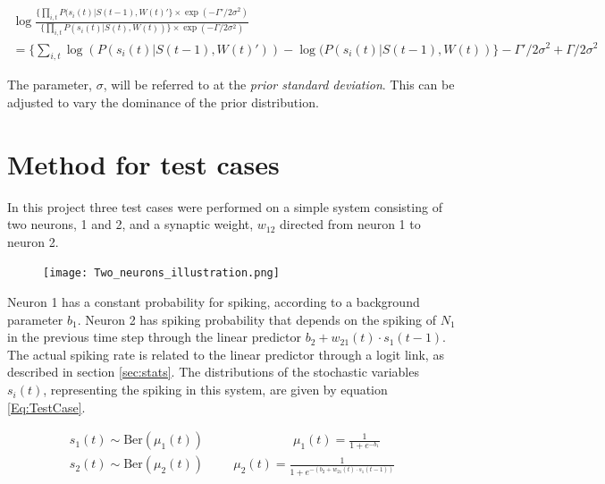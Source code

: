 \begin{equation}
\label{eq:ratio}
\begin{split}
    \log \frac{\big \{ \prod_{i,t} P(s_{i}(t)|S(t-1), W(t)'\big \} \times \exp(-\Gamma' /2\sigma^2)}{\big \{ \prod_{i,t}  P(s_{i}(t)|S(t), W(t)) \big \} \times \exp(-\Gamma /2\sigma^2)} \\
    = \Big \{ \sum_{i,t} \log( P(s_{i}(t)|S(t-1), W(t)')) - \log( P(s_{i}(t)|S(t-1), W(t)) \Big \} -\Gamma' /2\sigma^2 +  \Gamma /2\sigma^2
\end{split}
\end{equation}

The parameter, $\sigma$, will be referred to at the \textit{prior standard deviation}. This can be adjusted to vary the dominance of the prior distribution. 


\section{Method for test cases}
\label{Method}

In this project three test cases were performed on a simple system consisting of two neurons, 1 and 2, and a synaptic weight, $w_{12}$ directed from neuron 1 to neuron 2.

\begin{figure}[h]
    \centering
    \texttt{[image: Two\_neurons\_illustration.png]}
\end{figure}

Neuron 1 has a constant probability for spiking, according to a background parameter $b_1$. Neuron 2 has spiking probability that depends on the spiking of $N_1$ in the previous time step through the linear predictor $b_2 + w_{21}(t) \cdot s_{1}(t-1)$. The actual spiking rate is related to the linear predictor through a logit link, as described in section \ref{sec:stats}. The distributions of the stochastic variables $s_{i}(t)$, representing the spiking in this system, are given by equation \ref{Eq:TestCase}.

\begin{equation}
\begin{split}
\label{Eq:TestCase}
    s_{1}(t) \sim \text{Ber}(\mu_{1}(t)) \hspace{3cm} \mu_{1}(t)= \frac{1}{1+e^{-b_1}} \\
    s_{2}(t) \sim \text{Ber}(\mu_{2}(t)) \hspace{1cm} \mu_{2}(t)= \frac{1}{1+e^{-(b_2 + w_{21}(t) \cdot s_{1}(t-1))}}
\end{split}
\end{equation}

